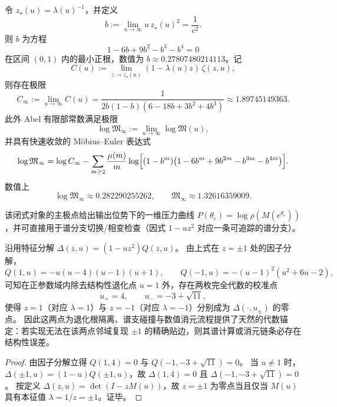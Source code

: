 \begin{proposition}[极端偏置的有限部常数极限]\label{prop:real-input-40-logM-infty}
令 $z_\star(u)=\lambda(u)^{-1}$，并定义
\[
b:=\lim_{u\to\infty}u\,z_\star(u)^2=\frac{1}{c^2}.
\]
则 $b$ 为方程
\[
1-6b+9b^2-b^3-b^4=0
\]
在区间 \((0,1)\) 内的最小正根，数值为 $b\approx 0.27807480214113$。记
\[
C(u):=\lim_{z\to z_\star(u)}(1-\lambda(u)z)\,\zeta(z,u),
\]
则存在极限
\[
C_\infty:=\lim_{u\to\infty}C(u)=\frac{1}{2b(1-b)(6-18b+3b^2+4b^3)}\approx 1.89745149363.
\]
此外 Abel 有限部常数满足极限
\[
\log\mathfrak{M}_\infty:=\lim_{u\to\infty}\log\mathfrak{M}(u),
\]
并具有快速收敛的 Möbius--Euler 表达式
\[
\log\mathfrak{M}_\infty
=\log C_\infty
-\sum_{m\ge 2}\frac{\mu(m)}{m}\log\Bigl[(1-b^m)\bigl(1-6b^m+9b^{2m}-b^{3m}-b^{4m}\bigr)\Bigr].
\]
数值上
\[
\log\mathfrak{M}_\infty\approx 0.282290255262,\qquad
\mathfrak{M}_\infty\approx 1.32616359009.
\]
\end{proposition}
该闭式对象的主极点给出输出位势下的一维压力曲线 $P(\theta_e)=\log\rho(M(e^{\theta_e}))$，并可直接用于谱分支切换/相变检查（因式 $1-uz^2$ 对应一条可追踪的谱分支）。


\begin{corollary}[同步核参数族的整数级共振点提供代数校准：正参数域内存在精确 \texorpdfstring{$\lambda=\pm1$}{lambda=±1} 的孤立点（230）]\label{cor:real-input-40-integer-resonance-calibration}
沿用特征分解 \(\Delta(z,u)=(1-uz^2)Q(z,u)\)。
由上式在 \(z=\pm1\) 处的因子分解，
\[
Q(1,u)=-u(u-4)(u-1)(u+1),\qquad Q(-1,u)=-(u-1)^2(u^2+6u-2),
\]
可知在正参数域内除去结构性退化点 \(u=1\) 外，存在两枚完全代数的校准点
\[
u_+=4,\qquad u_-=-3+\sqrt{11},
\]
使得 \(z=1\)（对应 \(\lambda=1\)）与 \(z=-1\)（对应 \(\lambda=-1\)）分别成为 \(\Delta(\cdot,u_\pm)\) 的零点。
因此这两点为退化根隔离、谱支碰撞与数值消元流程提供了天然的代数锚定：若实现无法在该两点邻域复现 \(\pm1\) 的精确贴边，则其谱计算或消元链条必存在结构性误差。
\end{corollary}
\begin{proof}
由因子分解立得 \(Q(1,4)=0\) 与 \(Q(-1,-3+\sqrt{11})=0\)。
当 \(u\neq 1\) 时，\(\Delta(\pm 1,u)=(1-u)Q(\pm 1,u)\)，故 \(\Delta(1,4)=0\) 且 \(\Delta(-1,-3+\sqrt{11})=0\)。
按定义 \(\Delta(z,u)=\det(I-zM(u))\)，故 \(z=\pm1\) 为零点当且仅当 \(M(u)\) 具有本征值 \(\lambda=1/z=\pm1\)。证毕。
\end{proof}


